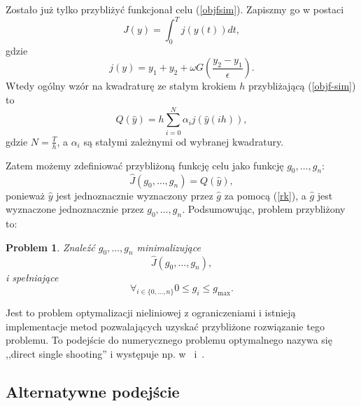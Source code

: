 \documentclass[11pt]{article}
\newtheorem{problem}{Problem}
\begin{document}
Zostało już tylko przybliżyć funkcjonał celu (\ref{objfsim}). Zapiszmy go w postaci
\begin{equation} \label{objf-sim}
  J(y) = \int_0^T j(y(t)) dt,
\end{equation}
gdzie
\begin{equation}
  j(y) = y_1 + y_2 + \omega G\left(\frac{y_2 - y_1}{\epsilon} \right).
\end{equation}
Wtedy ogólny wzór na kwadraturę ze stałym krokiem $h$ przybliżającą (\ref{objf-sim}) to
\begin{equation} \label{quad}
  Q(\hat{y}) = h\sum_{i = 0}^N \alpha_i j(\hat{y}(ih)),
\end{equation}
gdzie $N = \frac{T}{h}$, a $\alpha_i$ są stałymi zależnymi od wybranej kwadratury.

Zatem możemy zdefiniować przybliżoną funkcję celu jako funkcję $g_0,\ldots,g_n$:
\begin{equation}
  \hat{J}(g_0,\ldots, g_n) = Q(\hat{y}),
\end{equation}
ponieważ $\hat{y}$ jest jednoznacznie wyznaczony przez $\hat{g}$ za pomocą (\ref{rk}), a $\hat{g}$ jest wyznaczone jednoznacznie przez $g_0,\ldots,g_n$. Podsumowując, problem przybliżony to:
\begin{problem}\label{problemapprox}
  Znaleźć $g_0,\ldots, g_n$ minimalizujące
\begin{equation}\label{nlp}
  \hat{J}(g_0,\ldots, g_n),
\end{equation}
i spełniające
\begin{equation}\label{nlp_cons}
  \forall_{i \in \{0,\ldots,n\}} 0 \le g_i \le g_{\max}.
\end{equation}
\end{problem}

Jest to problem optymalizacji nieliniowej z ograniczeniami i istnieją implementacje metod pozwalających uzyskać przybliżone rozwiązanie tego problemu. To podejście do numerycznego problemu optymalnego nazywa się ,,direct single shooting'' i występuje np. w~\cite{diehl} i~\cite{rao-methods}.

\subsection{Alternatywne podejście}
\end{document}
